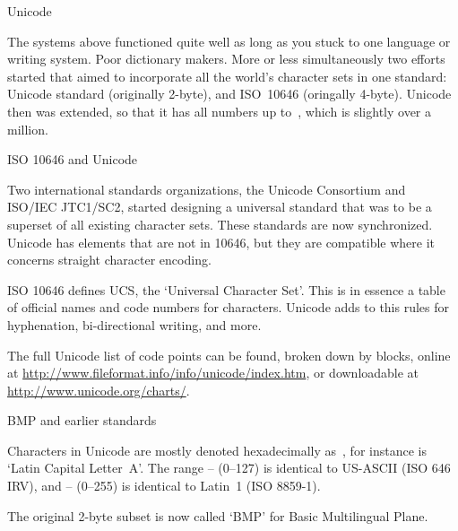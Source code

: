  {Unicode}
\label{sec:unicode}

The systems above functioned quite well as long as you stuck to one
language or writing system. Poor dictionary makers. More or less
simultaneously two efforts started that aimed to incorporate all the
world's character sets in one standard: Unicode standard (originally 2-byte),
and ISO~10646 (oringally 4-byte). Unicode then was
extended, so that it has all numbers up to~, which is
slightly over a million. 

 {ISO 10646 and Unicode}

Two international standards organizations,
the Unicode Consortium and ISO/IEC JTC1/SC2,
started designing a universal standard that was to be a
superset of all existing character sets. These standards are now
synchronized. Unicode has elements
that are not in 10646, but they are compatible where it concerns
straight character encoding.

ISO 10646 defines UCS, the `Universal Character Set'. This is in essence a table of official
names
and code numbers for characters. Unicode adds to this rules for hyphenation,
bi-directional writing, and more.

The full Unicode list of code points can be found, broken down by
blocks, online at
\url{http://www.fileformat.info/info/unicode/index.htm}, or
downloadable at \url{http://www.unicode.org/charts/}.

 {BMP and earlier standards}

Characters in Unicode are mostly denoted hexadecimally as~,
for instance  is `Latin Capital Letter~A'.
The range -- (0--127) is identical to US-ASCII
(ISO 646 IRV), and -- (0--255) is identical to
Latin~1 (ISO 8859-1).

The original 2-byte subset is
now called `BMP' for Basic Multilingual Plane.

